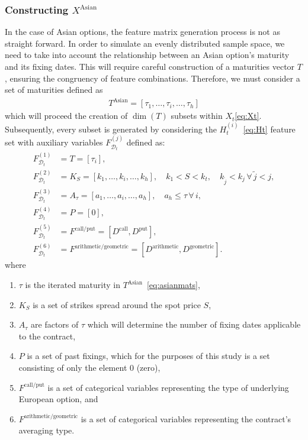 \documentclass[11pt]{article}
\newcommand{\D}{\mathcal{D}}
\begin{document}
		\subsubsection{Constructing $X^{\text{Asian}}$}
			\vfill
			In the case of Asian options, the feature matrix generation process is not as straight forward. In order to simulate an evenly distributed sample space, we need to take into account the relationship between an Asian option's maturity and its fixing dates. This will require careful construction of a maturities vector $T$, ensuring the congruency of feature combinations. Therefore, we must consider a set of maturities defined as
			\begin{align}
				T^{\text{Asian}} = \left[ \tau_1, \ldots, \tau_{i}, \ldots, \tau_{h} \right] \label{eq:asianmats}
			\end{align}
			which will proceed the creation of $\dim{(T)}$ subsets within $X_{t}$\eqref{eq:Xt}. Subsequently, every subset is generated by considering the $H^{(i)}_{t}$~\eqref{eq:Ht} feature set with auxiliary variables $F_{\D_{t}}^{(j)}$ defined as:
			\begin{equation}
				\begin{aligned}
					F_{\D_{t}}^{(1)} &= T = \left[ \tau_{i} \right], \\
					F_{\D_{t}}^{(2)} &= K_{S} = \left[ k_1, \ldots, k_{i}, \ldots, k_{h} \right], \quad  k_1 < S < k_t, \quad k_{\tilde{j}} < k_j \, \forall \, \tilde{j} < j, \\
					F_{\D_{t}}^{(3)} &= A_{\tau} = \left[ a_1, \ldots, a_{i}, \ldots, a_{h} \right], \quad a_{h} \leq \tau \, \forall \, i, \\
					F_{\D_{t}}^{(4)} &= P = \left[ 0 \right], \\
					F_{\D_{t}}^{(5)} &= F^{\text{call/put}} = \left[ D^{\text{call}}, D^{\text{put}} \right], \\
					F_{\D_{t}}^{(6)} &= F^{\text{arithmetic/geometric}} = \left[ D^{\text{arithmetic}}, D^{\text{geometric}} \right].
				\end{aligned}
			\end{equation}
			where
			\begin{enumerate}
				\item $\tau$ is the iterated maturity in $T^{\text{Asian}}$~\eqref{eq:asianmats},
				\item $K_{S}$ is a set of strikes spread around the spot price $S$,
				\item $A_{\tau}$ are factors of $\tau$ which will determine the number of fixing dates applicable to the contract,
				\item $P$ is a set of past fixings, which for the purposes of this study is a set consisting of only the element $0$ (zero),
				\item $F^{\text{call/put}}$ is a set of categorical variables representing the type of underlying European option, and
				\item $F^{\text{arithmetic/geometric}}$ is a set of categorical variables representing the contract's averaging type.
			\end{enumerate}
\end{document}
